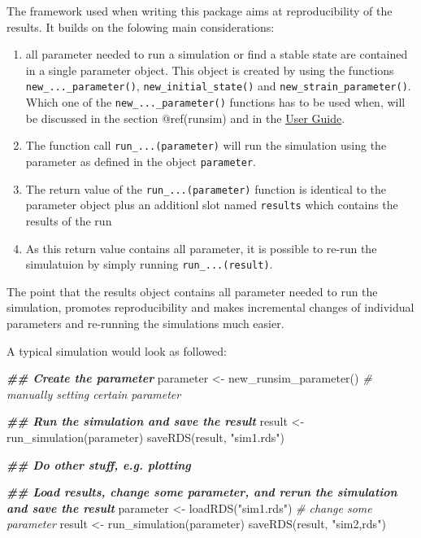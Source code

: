 \documentclass[]{elsarticle} %
\newenvironment{Shaded}{\begin{snugshade}}{\end{snugshade}}
\newcommand{\CommentTok}[1]{\textcolor[rgb]{0.56,0.35,0.01}{\textit{#1}}}
\newcommand{\DocumentationTok}[1]{\textcolor[rgb]{0.56,0.35,0.01}{\textbf{\textit{#1}}}}
\newcommand{\FunctionTok}[1]{\textcolor[rgb]{0.00,0.00,0.00}{#1}}
\newcommand{\NormalTok}[1]{#1}
\newcommand{\OtherTok}[1]{\textcolor[rgb]{0.56,0.35,0.01}{#1}}
\newcommand{\StringTok}[1]{\textcolor[rgb]{0.31,0.60,0.02}{#1}}
\providecommand{\tightlist}{%
  \setlength{\itemsep}{0pt}\setlength{\parskip}{0pt}}
\begin{document}
The framework used when writing this package aims at reproducibility of
the results. It builds on the folowing main considerations:

\begin{enumerate}
\def\labelenumi{\arabic{enumi}.}
\tightlist
\item
  all parameter needed to run a simulation or find a stable state are
  contained in a single parameter object. This object is created by
  using the functions \texttt{new\_...\_parameter()},
  \texttt{new\_initial\_state()} and \texttt{new\_strain\_parameter()}.
  Which one of the \texttt{new\_...\_parameter()} functions has to be
  used when, will be discussed in the section @ref(runsim) and in the
  \href{LINK_NEEDED}{User Guide}.
\item
  The function call \texttt{run\_...(parameter)} will run the simulation
  using the parameter as defined in the object \texttt{parameter}.
\item
  The return value of the \texttt{run\_...(parameter)} function is
  identical to the parameter object plus an additionl slot named
  \texttt{results} which contains the results of the run
\item
  As this return value contains all parameter, it is possible to re-run
  the simulatuion by simply running \texttt{run\_...(result)}.
\end{enumerate}

The point that the results object contains all parameter needed to run
the simulation, promotes reproducibility and makes incremental changes
of individual parameters and re-running the simulations much easier.

A typical simulation would look as followed:

\begin{Shaded}
\begin{Highlighting}[]
\DocumentationTok{\#\# Create the parameter}
\NormalTok{parameter }\OtherTok{\textless{}{-}} \FunctionTok{new\_runsim\_parameter}\NormalTok{()}
\CommentTok{\# manually setting certain parameter}

\DocumentationTok{\#\# Run the simulation and save the result}
\NormalTok{result }\OtherTok{\textless{}{-}} \FunctionTok{run\_simulation}\NormalTok{(parameter)}
\FunctionTok{saveRDS}\NormalTok{(result, }\StringTok{"sim1.rds"}\NormalTok{)}

\DocumentationTok{\#\# Do other stuff, e.g. plotting}

\DocumentationTok{\#\# Load results, change some parameter, and rerun the simulation and save the result}
\NormalTok{parameter }\OtherTok{\textless{}{-}} \FunctionTok{loadRDS}\NormalTok{(}\StringTok{"sim1.rds"}\NormalTok{)}
\CommentTok{\# change some parameter}
\NormalTok{result }\OtherTok{\textless{}{-}} \FunctionTok{run\_simulation}\NormalTok{(parameter)}
\FunctionTok{saveRDS}\NormalTok{(result, }\StringTok{"sim2,rds"}\NormalTok{)}
\end{Highlighting}
\end{Shaded}
\end{document}
